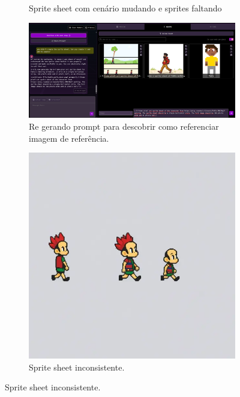 \begin{figure}[htbp]
\begin{subfigure}{0.45\linewidth}
        \caption{\small Sprite sheet com cenário mudando e sprites faltando}
        \label{fig:rosebud4d}
    \end{subfigure}
    \begin{subfigure}{0.8\linewidth}
        \centering
        \includegraphics[width=1\linewidth]{figs/rosebud/rosebud_tela8.PNG}
        \caption{\small Re gerando prompt para descobrir como referenciar imagem de referência.}
        \label{fig:rosebud4e}
    \end{subfigure}
    \begin{subfigure}{0.4\linewidth}
        \centering
        \includegraphics[width=1\linewidth]{figs/rosebud/rosebud_resultado_tela8.PNG}
        \caption{\small Sprite sheet inconsistente.}
        \label{fig:rosebud4f}
    \end{subfigure}
\end{figure}